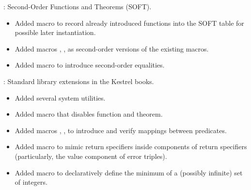 
\begin{frame}

\implibtitle

:
Second-Order Functions and Theorems (SOFT).
\begin{itemize}
\item Added macro  to record already introduced functions
      into the SOFT table for possible later instantiation.
\item Added macros , , 
      as second-order versions of the existing macros.
\item Added macro  to introduce second-order equalities.
\end{itemize}

\end{frame}


\begin{frame}

\implibtitle

:
Standard library extensions in the Kestrel books.
\begin{itemize}
\item Added several system utilities.
\item Added macro  that disables function and theorem.
\item Added macros , , 
      to introduce and verify mappings between predicates.
\item Added macro  to mimic  return specifiers
      inside components of  return specifiers
      (particularly, the value component of error triples).
\item Added macro  to declaratively define
      the minimum of a (possibly infinite) set of integers.
\end{itemize}

\end{frame}


